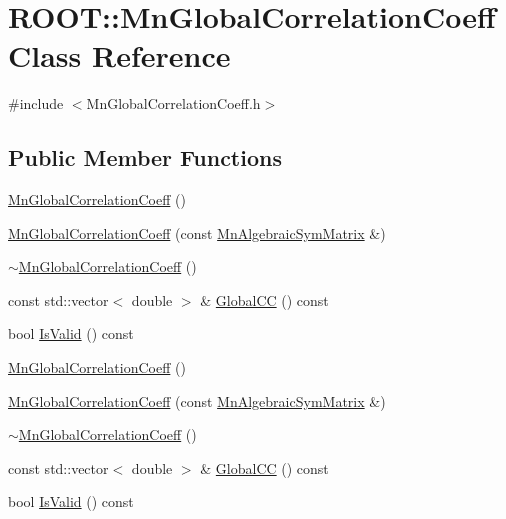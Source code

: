 \hypertarget{classROOT_1_1Minuit2_1_1MnGlobalCorrelationCoeff}{}\section{R\+O\+OT\+:\+:Mn\+Global\+Correlation\+Coeff Class Reference}
\label{classROOT_1_1Minuit2_1_1MnGlobalCorrelationCoeff}


{\ttfamily \#include $<$Mn\+Global\+Correlation\+Coeff.\+h$>$}

\subsection*{Public Member Functions}
\begin{DoxyCompactItemize}
\item 
\mbox{\hyperlink{classROOT_1_1Minuit2_1_1MnGlobalCorrelationCoeff_a02d0479009453f093434429ce1eadf0a}{Mn\+Global\+Correlation\+Coeff}} ()
\item 
\mbox{\hyperlink{classROOT_1_1Minuit2_1_1MnGlobalCorrelationCoeff_a0781ecab575fcbc6dc59bfd85b1b978d}{Mn\+Global\+Correlation\+Coeff}} (const \mbox{\hyperlink{namespaceROOT_1_1Minuit2_a9e74ad97f5537a2e80e52b04d98ecc6e}{Mn\+Algebraic\+Sym\+Matrix}} \&)
\item 
\mbox{\hyperlink{classROOT_1_1Minuit2_1_1MnGlobalCorrelationCoeff_a2fb461accef753e2402948f0e2603d7a}{$\sim$\+Mn\+Global\+Correlation\+Coeff}} ()
\item 
const std\+::vector$<$ double $>$ \& \mbox{\hyperlink{classROOT_1_1Minuit2_1_1MnGlobalCorrelationCoeff_ab078e8b07600339fea0af842a8e2de00}{Global\+CC}} () const
\item 
bool \mbox{\hyperlink{classROOT_1_1Minuit2_1_1MnGlobalCorrelationCoeff_a1fe4d8b557ebda40e092ed3b7032fc44}{Is\+Valid}} () const
\item 
\mbox{\hyperlink{classROOT_1_1Minuit2_1_1MnGlobalCorrelationCoeff_a02d0479009453f093434429ce1eadf0a}{Mn\+Global\+Correlation\+Coeff}} ()
\item 
\mbox{\hyperlink{classROOT_1_1Minuit2_1_1MnGlobalCorrelationCoeff_a0781ecab575fcbc6dc59bfd85b1b978d}{Mn\+Global\+Correlation\+Coeff}} (const \mbox{\hyperlink{namespaceROOT_1_1Minuit2_a9e74ad97f5537a2e80e52b04d98ecc6e}{Mn\+Algebraic\+Sym\+Matrix}} \&)
\item 
\mbox{\hyperlink{classROOT_1_1Minuit2_1_1MnGlobalCorrelationCoeff_a2fb461accef753e2402948f0e2603d7a}{$\sim$\+Mn\+Global\+Correlation\+Coeff}} ()
\item 
const std\+::vector$<$ double $>$ \& \mbox{\hyperlink{classROOT_1_1Minuit2_1_1MnGlobalCorrelationCoeff_ab078e8b07600339fea0af842a8e2de00}{Global\+CC}} () const
\item 
bool \mbox{\hyperlink{classROOT_1_1Minuit2_1_1MnGlobalCorrelationCoeff_a1fe4d8b557ebda40e092ed3b7032fc44}{Is\+Valid}} () const
\end{DoxyCompactItemize}


